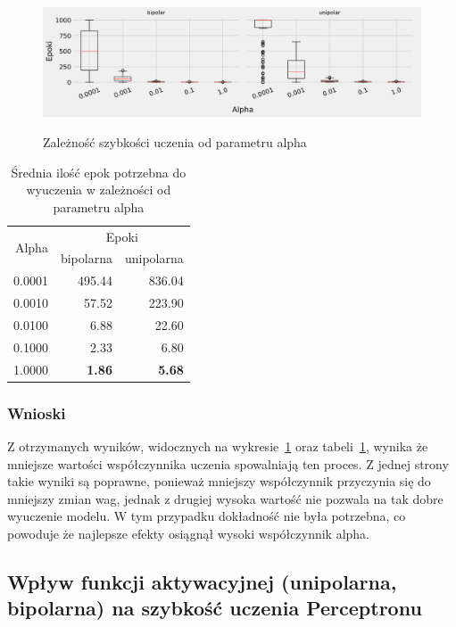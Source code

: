 \documentclass{article}
\begin{document}
\begin{figure}[!h]
	\centering
	\caption{Zależność szybkości uczenia od parametru alpha}
	\includegraphics[width=\textwidth]{per_alpha.png}
	\label{fig:res3}
\end{figure}

\begin{table}[!h]
	\caption{Średnia ilość epok potrzebna do wyuczenia w zależności od parametru alpha}
	\label{tabela-res-3}
	\centering
	\begin{tabular}{rrr}
		\toprule
		\multirow{2}{*}{Alpha}   & \multicolumn{2}{c}{Epoki} \\
		       & bipolarna     & unipolarna    \\
		\midrule
		0.0001 & 495.44        & 836.04        \\
		0.0010 & 57.52         & 223.90        \\
		0.0100 & 6.88          & 22.60         \\
		0.1000 & 2.33          & 6.80          \\
		1.0000 & \textbf{1.86} & \textbf{5.68} \\
		\bottomrule
	\end{tabular}
\end{table}

\subsubsection*{Wnioski}

Z otrzymanych wyników, widocznych na wykresie~\ref{fig:res3} oraz tabeli~\ref{tabela-res-3}, wynika że mniejsze wartości współczynnika uczenia spowalniają ten proces. Z jednej strony takie wyniki są poprawne, ponieważ mniejszy współczynnik przyczynia się do mniejszy zmian wag, jednak z drugiej wysoka wartość nie pozwala na tak dobre wyuczenie modelu. W tym przypadku dokładność nie była potrzebna, co powoduje że najlepsze efekty osiągnął wysoki współczynnik alpha.

\newpage
\subsection{Wpływ funkcji aktywacyjnej (unipolarna, bipolarna) na szybkość uczenia Perceptronu}
\end{document}
